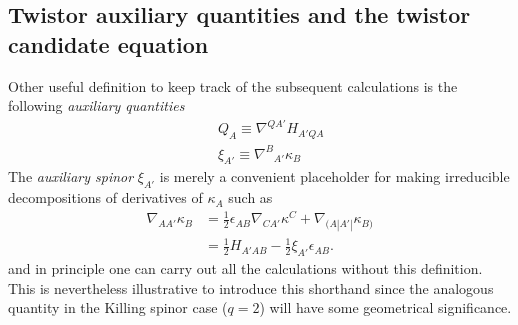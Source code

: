 \documentclass[10pt,a4paper]{article}
\theoremstyle{plain}
\begin{document}
{  \subsection{Twistor auxiliary quantities and the twistor candidate equation}
Other useful definition to keep track of the subsequent
calculations is the following \emph{auxiliary quantities}
\begin{subequations}
  \begin{eqnarray}
      && Q_{A}  \equiv \nabla^{QA'}H_{A'QA} \label{def_Q_twistor} \\
      && \xi_{A'} \equiv \nabla^B{}_{A'}\kappa_B \label{def_xi_twistor}
  \end{eqnarray}
\end{subequations}
  The \emph{auxiliary spinor} $\xi_{A'}$ is merely a convenient
  placeholder for making irreducible decompositions of derivatives of
  $\kappa_A$ such as
  \begin{align}\label{decomp_Der_kappa}
    \nabla_{AA'}\kappa _{B} & = \tfrac{1}{2} \epsilon _{AB}
    \nabla_{CA'}\kappa ^{C} + \nabla_{(A|A'|}\kappa _{B)}
 \\ & = \tfrac{1}{2} H_{A'AB} - \tfrac{1}{2} \xi _{A'} \epsilon_{AB}.
  \end{align}
  and in principle one can carry out all the calculations without this
  definition. This is nevertheless illustrative to introduce this
  shorthand since the analogous quantity in the Killing spinor case
  ($q=2$) will have some geometrical significance.

  \medskip
  
}
\end{document}
